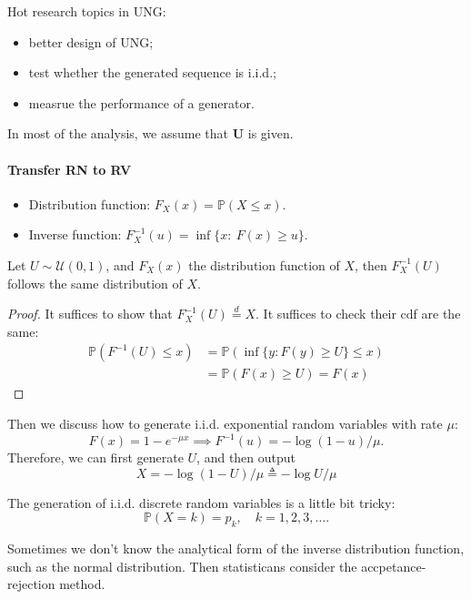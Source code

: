 Hot research topics in UNG:
\begin{itemize}
\item
better design of UNG;
\item
test whether the generated sequence is i.i.d.;
\item
measrue the performance of a generator.
\end{itemize}

In most of the analysis, we assume that $\bm U$ is given.

\paragraph{Transfer RN to RV}
\begin{itemize}
\item
Distribution function: $F_X(x) = \mathbb{P}(X\le x)$.
\item
Inverse function: $F_X^{-1}(u) = \inf\{x:~F(x)\ge u\}$.
\end{itemize}

\begin{theorem}
Let $U\sim\mathcal{U}(0,1)$, and $F_X(x)$ the distribution function of $X$,
then $F_X^{-1}(U)$ follows the same distribution of $X$.
\end{theorem}
\begin{proof}
It suffices to show that $F^{-1}_X(U)\stackrel{d}{=}X$.
It suffices to check their cdf are the same:
\begin{align*}
\mathbb{P}(F^{-1}(U)\le x)&=
\mathbb{P}(\inf\{y: F(y)\ge U\}\le x)\\
&=\mathbb{P}(F(x)\ge U)=F(x)
\end{align*}
\end{proof}

\begin{example}
Then we discuss how to generate i.i.d. exponential random variables with rate $\mu$:
\[
F(x) = 1 - e^{-\mu x}\implies
F^{-1}(u) = -\log (1-u)/\mu.
\]
Therefore, we can first generate $U$, and then output
\[
X = -\log (1-U)/\mu\triangleq -\log U/\mu
\]
\end{example}

\begin{example}
The generation of i.i.d. discrete random variables is a little bit tricky:
\[
\mathbb{P}(X=k) = p_k,\quad
k=1,2,3,\ldots.
\]
\end{example}

Sometimes we don't know the analytical form of the inverse distribution function, such as the normal distribution.
Then statisticans consider the accpetance-rejection method.

